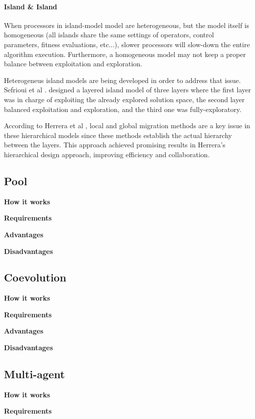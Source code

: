\paragraph*{Island \& Island} When processors in island-model model are heterogeneous, but the model itself is homogeneous (all islands share the same settings of operators, control parameters, fitness evaluations, etc...), slower processors will slow-down the entire algorithm execution. Furthermore, a homogeneous model may not keep a proper balance between exploitation and exploration.  

Heterogeneus island models are being developed in order to address that issue. Sefrioui et al \cite{112}. designed a layered island model of three layers where the first layer was in charge of exploiting the already explored solution space, the second layer balanced exploitation and exploration, and the third one was fully-exploratory.

According to Herrera et al \cite{57}, local and global migration methods are a key issue in these hierarchical models since these methods establish the actual hierarchy between the layers. This approach achieved promising results in Herrera's hierarchical design approach, improving efficiency and collaboration. 

\subsection{Pool}

\textbf{How it works}

\textbf{Requirements}

\textbf{Advantages}

\textbf{Disadvantages}

\subsection{Coevolution}

\textbf{How it works}

\textbf{Requirements}

\textbf{Advantages}

\textbf{Disadvantages}

\subsection{Multi-agent}

\textbf{How it works}

\textbf{Requirements}


